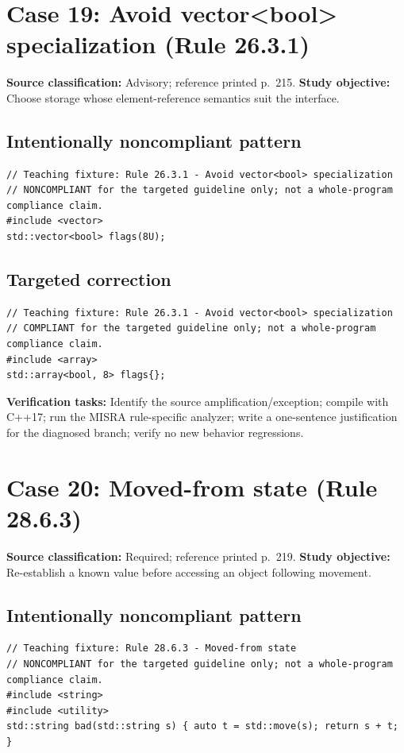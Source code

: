 \documentclass[10pt,letterpaper]{article}
\begin{document}
\section{Case 19: Avoid vector\textless{}bool\textgreater{} specialization (Rule 26.3.1)}
\textbf{Source classification:} Advisory; reference printed p.~215. \textbf{Study objective:} Choose storage whose element-reference semantics suit the interface.
\subsection*{Intentionally noncompliant pattern}
\begin{lstlisting}
// Teaching fixture: Rule 26.3.1 - Avoid vector<bool> specialization
// NONCOMPLIANT for the targeted guideline only; not a whole-program compliance claim.
#include <vector>
std::vector<bool> flags(8U);
\end{lstlisting}
\subsection*{Targeted correction}
\begin{lstlisting}
// Teaching fixture: Rule 26.3.1 - Avoid vector<bool> specialization
// COMPLIANT for the targeted guideline only; not a whole-program compliance claim.
#include <array>
std::array<bool, 8> flags{};
\end{lstlisting}
\textbf{Verification tasks:} Identify the source amplification/exception; compile with C++17; run the MISRA rule-specific analyzer; write a one-sentence justification for the diagnosed branch; verify no new behavior regressions.

\section{Case 20: Moved-from state (Rule 28.6.3)}
\textbf{Source classification:} Required; reference printed p.~219. \textbf{Study objective:} Re-establish a known value before accessing an object following movement.
\subsection*{Intentionally noncompliant pattern}
\begin{lstlisting}
// Teaching fixture: Rule 28.6.3 - Moved-from state
// NONCOMPLIANT for the targeted guideline only; not a whole-program compliance claim.
#include <string>
#include <utility>
std::string bad(std::string s) { auto t = std::move(s); return s + t; }
\end{lstlisting}
\end{document}
